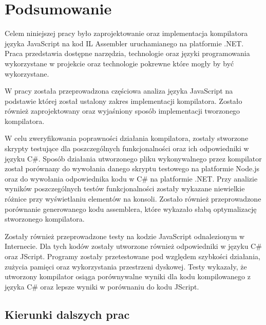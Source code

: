 %


\chapter*{Podsumowanie}

\par Celem niniejszej pracy było zaprojektowanie oraz implementacja kompilatora języka JavaScript na kod IL Assembler uruchamianego na platformie .NET. Praca przedstawia dostępne narzędzia, technologie oraz języki programowania wykorzystane w projekcie oraz technologie pokrewne które mogły by być wykorzystane.
\par W pracy została przeprowadzona częściowa analiza języka JavaScript na podstawie której został ustalony zakres implementacji kompilatora. Zostało również zaprojektowany oraz wyjaśniony sposób implementacji tworzonego kompilatora.
\par W celu zweryfikowania poprawności działania kompilatora, zostały stworzone skrypty testujące dla poszczególnych funkcjonalności oraz ich odpowiedniki w języku C\#. Sposób działania utworzonego pliku wykonywalnego przez kompilator został porównany do wywołania danego skryptu testowego na platformie Node.js oraz do wywołania odpowiednika kodu w C\# na platformie .NET. Przy analizie wyników poszczególnych testów funkcjonalności zostały wykazane niewielkie różnice przy wyświetlaniu elementów na konsoli. Zostało również przeprowadzone porównanie generowanego kodu assemblera, które wykazało słabą optymalizację stworzonego kompilatora.
\par Zostały również przeprowadzone testy na kodzie JavaScript odnalezionym w Internecie. Dla tych kodów zostały utworzone również odpowiedniki w języku C\# oraz JScript. Programy zostały przetestowane pod względem szybkości działania, zużycia pamięci oraz wykorzystania przestrzeni dyskowej. Testy wykazały, że utworzony kompilator osiąga porównywalne wyniki dla kodu kompilowanego z języka C\# oraz lepsze wyniki w porównaniu do kodu JScript.

\newpage
\section*{Kierunki dalszych prac}

